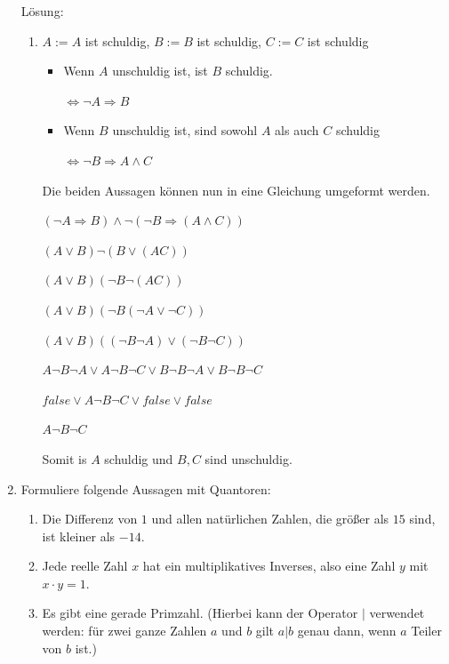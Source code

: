 \documentclass[main.tex]{subfiles}
\begin{document}
\begin{enumerate}
	      Lösung:
	      \begin{enumerate}
		      \item \( A := A \) ist schuldig, \( B := B \) ist schuldig, \( C := C \) ist schuldig
		            \begin{itemize}
			            \item  Wenn \( A \) unschuldig ist, ist \( B \) schuldig.

			                  \( \Leftrightarrow \neg A \Rightarrow B \)
			            \item  Wenn \( B \) unschuldig ist, sind sowohl \( A \) als auch \( C \) schuldig

			                  \( \Leftrightarrow \neg B \Rightarrow A \land C  \)
		            \end{itemize}

		            Die beiden Aussagen können nun in eine Gleichung umgeformt werden.

		            \( ( \neg A \Rightarrow B ) \land \neg ( \neg B \Rightarrow (A \land C ) ) \)

		            \( ( A \lor B ) \neg ( B \lor  (AC) ) \)

		            \( ( A \lor B ) ( \neg B \neg (AC) ) \)

		            \( ( A \lor B ) ( \neg B (\neg A \lor \neg C) ) \)

		            \( ( A \lor B ) ( (\neg B \neg A ) \lor (\neg B \neg C) ) \)

		            \( A \neg B \neg A \lor A \neg B \neg C \lor B \neg B \neg A \lor B \neg B \neg C \)

		            \( false \lor A \neg B \neg C \lor false \lor false \)

		            \( A \neg B \neg C \)

		            Somit is \( A \) schuldig und \( B, C \) sind unschuldig.
	      \end{enumerate}
	\item Formuliere folgende Aussagen mit Quantoren:
	      \begin{enumerate}
		      \item Die Differenz von \( 1 \) und allen natürlichen Zahlen, die größer als
		            \( 15 \) sind, ist kleiner als \( -14 \).
		      \item Jede reelle Zahl \( x \) hat ein multiplikatives Inverses, also eine Zahl
		            \( y \) mit \( x \cdot y = 1 \).
		      \item Es gibt eine gerade Primzahl.
		            (Hierbei kann der Operator \(|\) verwendet werden: für zwei ganze Zahlen
		            \( a \) und \( b \) gilt \( a | b \) genau dann, wenn \( a \) Teiler von
		            \( b \) ist.)
	      \end{enumerate}


\end{enumerate}
\end{document}
